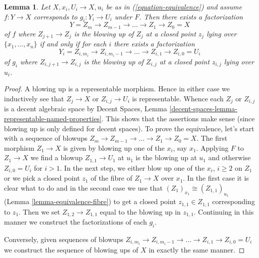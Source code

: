 \documentclass{stacks-project}
\theoremstyle{plain}
\newtheorem{lemma}[subsection]{Lemma}
\theoremstyle{definition}
\theoremstyle{remark}
\numberwithin{equation}{subsection}
\begin{document}
\begin{lemma}
\label{lemma-equivalence-sequence-blowups}
Let $X, x_i, U_i \to X, u_i$ be as in (\ref{equation-equivalence})
and assume $f : Y \to X$ corresponds to $g_i : Y_i \to U_i$ under $F$.
Then there exists a factorization
$$
Y = Z_m \to Z_{m - 1} \to \ldots \to Z_1 \to Z_0 = X
$$
of $f$ where $Z_{j + 1} \to Z_j$ is the blowing up of $Z_j$ at a closed
point $z_j$ lying over $\{x_1, \ldots, x_n\}$ if and only if for each
$i$ there exists a factorization
$$
Y_i = Z_{i, m_i} \to Z_{i, m_i - 1} \to \ldots \to Z_{i, 1} \to Z_{i, 0} = U_i
$$
of $g_i$ where $Z_{i, j + 1} \to Z_{i, j}$ is the blowing up of $Z_{i, j}$
at a closed point $z_{i, j}$ lying over $u_i$.
\end{lemma}

\begin{proof}
A blowing up is a representable morphism. Hence in either case
we inductively see that $Z_j \to X$ or $Z_{i, j} \to U_i$ is
representable. Whence each $Z_j$ or $Z_{i, j}$ is a decent
algebraic space by Decent Spaces, Lemma
\ref{decent-spaces-lemma-representable-named-properties}.
This shows that the assertions make sense (since blowing up
is only defined for decent spaces).
To prove the equivalence, let's start with a sequence of blowups
$Z_m \to Z_{m - 1} \to \ldots \to Z_1 \to Z_0 = X$.
The first morphism $Z_1 \to X$ is given
by blowing up one of the $x_i$, say $x_1$. Applying $F$
to $Z_1 \to X$ we find a blowup $Z_{1, 1} \to U_1$ at $u_1$
is the blowing up at $u_1$ and otherwise $Z_{i, 0} = U_i$ for $i > 1$.
In the next step, we either blow up one of the $x_i$, $i \geq 2$
on $Z_1$ or we pick a closed point $z_1$ of the fibre of $Z_1 \to X$
over $x_1$. In the first case it is clear what to do and in
the second case we use that $(Z_1)_{x_1} \cong (Z_{1, 1})_{u_1}$
(Lemma \ref{lemma-equivalence-fibre})
to get a closed point $z_{1, 1} \in Z_{1, 1}$ corresponding to $z_1$.
Then we set $Z_{1, 2} \to Z_{1, 1}$ equal to the blowing up
in $z_{1, 1}$. Continuing in this manner we construct the factorizations
of each $g_i$.

\medskip\noindent
Conversely, given sequences of blowups
$Z_{i, m_i} \to Z_{i, m_i - 1} \to \ldots \to Z_{i, 1} \to Z_{i, 0} = U_i$
we construct the sequence of blowing ups of $X$ in exactly the same manner.
\end{proof}
\end{document}
